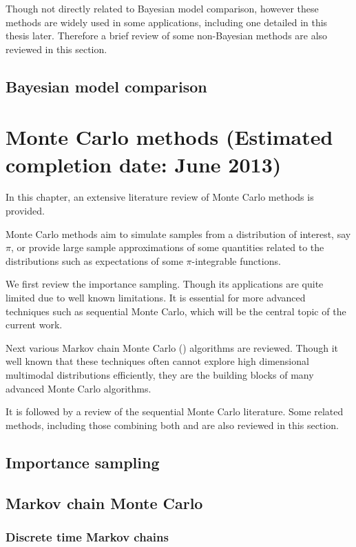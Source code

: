 \documentclass[11pt, bib, fontset = Minion]{marticle}
\def\finish#1{(Estimated completion date: #1 2013)}
\begin{document}
Though not directly related to Bayesian model comparison, however these
methods are widely used in some applications, including one detailed in this
thesis later. Therefore a brief review of some non-Bayesian methods are also
reviewed in this section.

\subsection{Bayesian model comparison}

\section{Monte Carlo methods \finish{June}}

In this chapter, an extensive literature review of Monte Carlo methods is
provided.

Monte Carlo methods aim to simulate samples from a distribution of interest,
say $\pi$, or provide large sample approximations of some quantities related
to the distributions such as expectations of some $\pi$-integrable functions.

We first review the importance sampling. Though its applications are quite
limited due to well known limitations. It is essential for more advanced
techniques such as sequential Monte Carlo, which will be the central topic of
the current work.

Next various Markov chain Monte Carlo (\mcmc) algorithms are reviewed. Though
it well known that these techniques often cannot explore high dimensional
multimodal distributions efficiently, they are the building blocks of many
advanced Monte Carlo algorithms.

It is followed by a review of the sequential Monte Carlo literature. Some
related methods, including those combining both \smc and \mcmc are also
reviewed in this section.

\subsection{Importance sampling}

\subsection{Markov chain Monte Carlo}

\subsubsection{Discrete time Markov chains}
\end{document}
